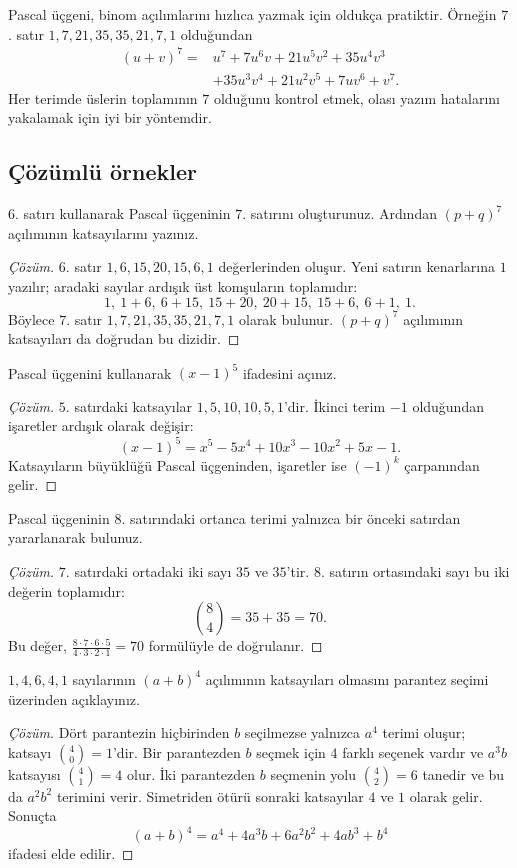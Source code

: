 Pascal üçgeni, binom açılımlarını hızlıca yazmak için oldukça pratiktir. Örneğin $7$. satır $1,7,21,35,35,21,7,1$ olduğundan
\begin{align*}
(u+v)^7={}&u^7+7u^6v+21u^5v^2+35u^4v^3\\
&+35u^3v^4+21u^2v^5+7uv^6+v^7.
\end{align*}
Her terimde üslerin toplamının $7$ olduğunu kontrol etmek, olası yazım hatalarını yakalamak için iyi bir yöntemdir.

\subsection{Çözümlü örnekler}

\begin{example}
$6$. satırı kullanarak Pascal üçgeninin $7$. satırını oluşturunuz. Ardından $(p+q)^7$ açılımının katsayılarını yazınız.
\end{example}
\begin{proof}[Çözüm]
$6$. satır $1,6,15,20,15,6,1$ değerlerinden oluşur. Yeni satırın kenarlarına $1$ yazılır; aradaki sayılar ardışık üst komşuların toplamıdır:
\[
1,\ 1+6,\ 6+15,\ 15+20,\ 20+15,\ 15+6,\ 6+1,\ 1.
\]
Böylece $7$. satır $1,7,21,35,35,21,7,1$ olarak bulunur. $(p+q)^7$ açılımının katsayıları da doğrudan bu dizidir.
\end{proof}

\begin{example}
Pascal üçgenini kullanarak $(x-1)^5$ ifadesini açınız.
\end{example}
\begin{proof}[Çözüm]
$5$. satırdaki katsayılar $1,5,10,10,5,1$'dir. İkinci terim $-1$ olduğundan işaretler ardışık olarak değişir:
\[
\boxed{(x-1)^5=x^5-5x^4+10x^3-10x^2+5x-1.}
\]
Katsayıların büyüklüğü Pascal üçgeninden, işaretler ise $(-1)^k$ çarpanından gelir.
\end{proof}

\begin{example}
Pascal üçgeninin $8$. satırındaki ortanca terimi yalnızca bir önceki satırdan yararlanarak bulunuz.
\end{example}
\begin{proof}[Çözüm]
$7$. satırdaki ortadaki iki sayı $35$ ve $35$'tir. $8$. satırın ortasındaki sayı bu iki değerin toplamıdır:
\[
\binom84=35+35=70.
\]
Bu değer, $\frac{8\cdot7\cdot6\cdot5}{4\cdot3\cdot2\cdot1}=70$ formülüyle de doğrulanır.
\end{proof}

\begin{example}
$1,4,6,4,1$ sayılarının $(a+b)^4$ açılımının katsayıları olmasını parantez seçimi üzerinden açıklayınız.
\end{example}
\begin{proof}[Çözüm]
Dört parantezin hiçbirinden $b$ seçilmezse yalnızca $a^4$ terimi oluşur; katsayı $\binom40=1$'dir. Bir parantezden $b$ seçmek için $4$ farklı seçenek vardır ve $a^3b$ katsayısı $\binom41=4$ olur. İki parantezden $b$ seçmenin yolu $\binom42=6$ tanedir ve bu da $a^2b^2$ terimini verir. Simetriden ötürü sonraki katsayılar $4$ ve $1$ olarak gelir. Sonuçta
\[
(a+b)^4=a^4+4a^3b+6a^2b^2+4ab^3+b^4
\]
ifadesi elde edilir.
\end{proof}

